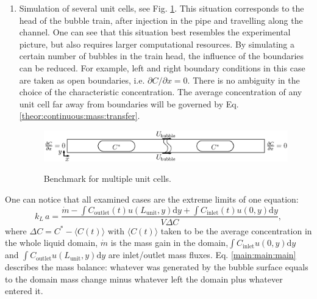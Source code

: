 \documentclass{article}
\newcommand{\beq}{\begin{equation}}
\newcommand{\feq}{\end{equation}}
\newcommand{\vol}{k_L\,a}
\newcommand{\lunit}{L_{\mathrm{unit}}}
\newcommand{\cinlet}{C_{\mathrm{inlet}}}
\newcommand{\coutlet}{C_{\mathrm{outlet}}}
\newcommand{\cstar}{C^{*}}
\begin{document}
\begin{enumerate}
\item 
Simulation of several unit cells, see Fig. \ref{fig:benchmark:alot}. This situation corresponds to the head of the
bubble train, after injection in the pipe and travelling along the channel. One can see that this
situation best resembles the experimental picture, but also requires larger computational
resources. By simulating a certain number of 
bubbles in the train head, the influence of the boundaries can be
reduced. For example, left and right boundary conditions in this case are taken as open boundaries, i.e. $\partial C/ \partial x = 0 $.  There is no ambiguity in the choice of the
characteristic concentration. The average concentration of any unit cell far away from boundaries will be governed
by Eq.
\ref{theor:continuous:mass:transfer}. 
\begin{figure}[htb!]
\includegraphics[width=\textwidth]{Figures/benchmark_alot.eps}\\
\caption{Benchmark for multiple unit cells. \label{fig:benchmark:alot}}
\end{figure}
\end{enumerate} 

One can notice that all examined cases are the extreme limits of one equation:
\beq
\label{main:main:main}
\vol=\frac{\dot{m}-\int{\coutlet(t) u(\lunit,y)\mathrm{d}y}+\int{\cinlet(t) u(0,y)\mathrm{d}y}}{V
\Delta C}, 
\feq
where $\Delta C=\cstar-\langle C(t) \rangle$ with $\langle C(t) \rangle$ taken to be
the average concentration in the whole liquid domain, $\dot{m}$ is the mass gain in
the domain,$\int{\cinlet u(0,y) \mathrm{d}y}$ and $\int{\coutlet
u(\lunit,y)\mathrm{d}y}$ are inlet/outlet mass fluxes. Eq. \ref{main:main:main}
describes the mass balance: whatever was generated by the bubble surface equals
to the domain mass change minus whatever left the domain plus whatever entered it.
\end{document}
